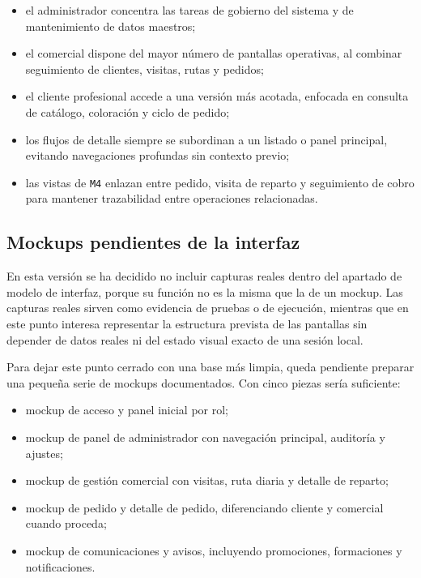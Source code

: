 \begin{itemize}
    \item el administrador concentra las tareas de gobierno del sistema y de mantenimiento de datos maestros;
    \item el comercial dispone del mayor número de pantallas operativas, al combinar seguimiento de clientes, visitas, rutas y pedidos;
    \item el cliente profesional accede a una versión más acotada, enfocada en consulta de catálogo, coloración y ciclo de pedido;
    \item los flujos de detalle siempre se subordinan a un listado o panel principal, evitando navegaciones profundas sin contexto previo;
    \item las vistas de \texttt{M4} enlazan entre pedido, visita de reparto y seguimiento de cobro para mantener trazabilidad entre operaciones relacionadas.
\end{itemize}

\subsection{Mockups pendientes de la interfaz}

En esta versión se ha decidido no incluir capturas reales dentro del apartado de modelo de interfaz, porque su función no es la misma que la de un mockup. Las capturas reales sirven como evidencia de pruebas o de ejecución, mientras que en este punto interesa representar la estructura prevista de las pantallas sin depender de datos reales ni del estado visual exacto de una sesión local.

Para dejar este punto cerrado con una base más limpia, queda pendiente preparar una pequeña serie de mockups documentados. Con cinco piezas sería suficiente:

\begin{itemize}
    \item mockup de acceso y panel inicial por rol;
    \item mockup de panel de administrador con navegación principal, auditoría y ajustes;
    \item mockup de gestión comercial con visitas, ruta diaria y detalle de reparto;
    \item mockup de pedido y detalle de pedido, diferenciando cliente y comercial cuando proceda;
    \item mockup de comunicaciones y avisos, incluyendo promociones, formaciones y notificaciones.
\end{itemize}

